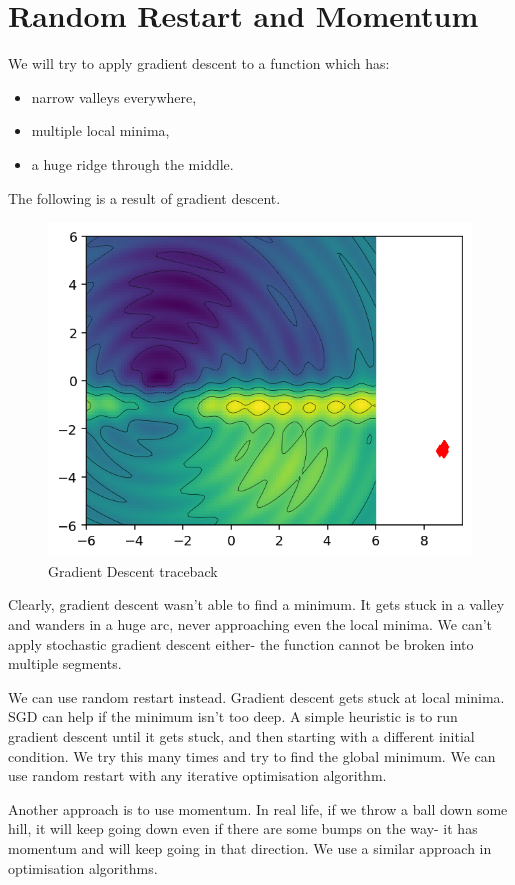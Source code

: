 \documentclass[a4paper, openany]{memoir}
\begin{document}
\section{Random Restart and Momentum}
We will try to apply gradient descent to a function which has:
\begin{itemize}
    \item narrow valleys everywhere,
    \item multiple local minima,
    \item a huge ridge through the middle.
\end{itemize}
The following is a result of gradient descent.
\begin{figure}[H]
    \centering
    \includegraphics[scale=0.8]{src/4.32 gradient descent horrible function.png}
    \caption{Gradient Descent traceback}
\end{figure}
\noindent Clearly, gradient descent wasn't able to find a minimum. It gets stuck in a valley and wanders in a huge arc, never approaching even the local minima. We can't apply stochastic gradient descent either- the function cannot be broken into multiple segments.

We can use random restart instead. Gradient descent gets stuck at local minima. SGD can help if the minimum isn't too deep. A simple heuristic is to run gradient descent until it gets stuck, and then starting with a different initial condition. We try this many times and try to find the global minimum. We can use random restart with any iterative optimisation algorithm.

Another approach is to use momentum. In real life, if we throw a ball down some hill, it will keep going down even if there are some bumps on the way- it has momentum and will keep going in that direction. We use a similar approach in optimisation algorithms.
\end{document}
